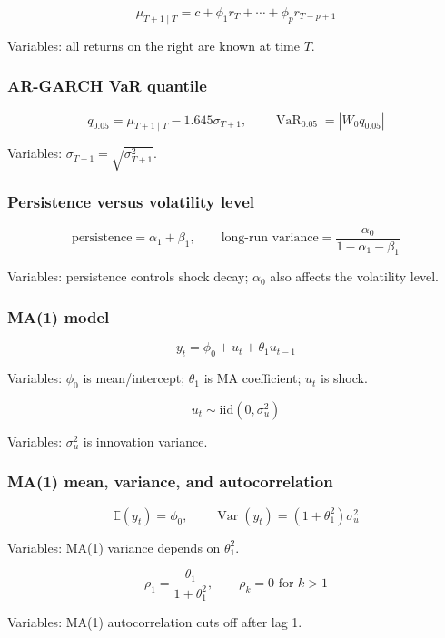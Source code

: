 \documentclass[
  8pt,
  twocolumn]{extarticle}
\begin{document}
\[
\mu_{T+1\mid T}=c+\phi_1r_T+\cdots+\phi_pr_{T-p+1}
\]

Variables: all returns on the right are known at time \(T\).

\subsubsection{AR-GARCH VaR quantile}\label{ar-garch-var-quantile}

\[
q_{0.05}=\mu_{T+1\mid T}-1.645\sigma_{T+1},\qquad \operatorname{VaR}_{0.05}=|W_0q_{0.05}|
\]

Variables: \(\sigma_{T+1}=\sqrt{\sigma_{T+1}^2}\).

\subsubsection{Persistence versus volatility
level}\label{persistence-versus-volatility-level}

\[
\text{persistence}=\alpha_1+\beta_1,\qquad \text{long-run variance}=\frac{\alpha_0}{1-\alpha_1-\beta_1}
\]

Variables: persistence controls shock decay; \(\alpha_0\) also affects
the volatility level.

\subsubsection{MA(1) model}\label{ma1-model}

\[
y_t=\phi_0+u_t+\theta_1u_{t-1}
\]

Variables: \(\phi_0\) is mean/intercept; \(\theta_1\) is MA coefficient;
\(u_t\) is shock.

\[
u_t\sim\mathrm{iid}(0,\sigma_u^2)
\]

Variables: \(\sigma_u^2\) is innovation variance.

\subsubsection{MA(1) mean, variance, and
autocorrelation}\label{ma1-mean-variance-and-autocorrelation}

\[
\mathbb E(y_t)=\phi_0,\qquad \operatorname{Var}(y_t)=(1+\theta_1^2)\sigma_u^2
\]

Variables: MA(1) variance depends on \(\theta_1^2\).

\[
\rho_1=\frac{\theta_1}{1+\theta_1^2},\qquad \rho_k=0\text{ for }k>1
\]

Variables: MA(1) autocorrelation cuts off after lag 1.
\end{document}
